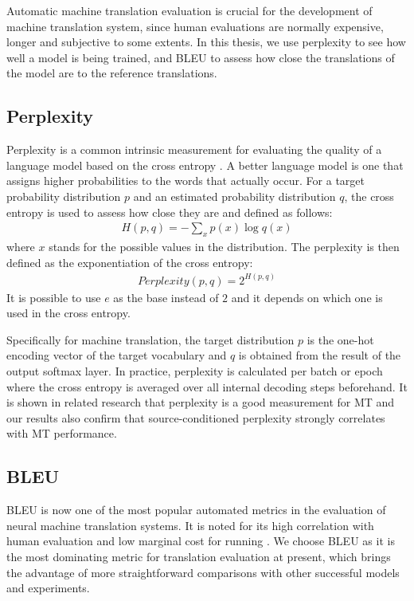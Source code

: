 Automatic machine translation evaluation is crucial for the development of machine translation system, since human evaluations are normally expensive, longer and subjective to some extents. In this thesis, we use perplexity to see how well a model is being trained, and BLEU to assess how close the translations of the model are to the reference translations.

\subsection{Perplexity}

Perplexity is a common intrinsic measurement for evaluating the quality of a language model based on the cross entropy \cite{koehn2009statistical}. A better language model is one that assigns higher probabilities to the words that actually occur. For a target probability distribution $ p $ and an estimated probability distribution $ q $, the cross entropy is used to assess how close they are and defined as follows:
\begin{align*}
H(p,q) = - \sum_{x} p(x) \log q(x)
\end{align*}
where $ x $ stands for the possible values in the distribution. The perplexity is then defined as the exponentiation of the cross entropy:
\begin{align*}
Perplexity(p,q) = 2^{H(p,q)}
\end{align*}
It is possible to use $ e $ as the base instead of $ 2 $ and it depends on which one is used in the cross entropy.

Specifically for machine translation, the target distribution $ p $ is the one-hot encoding vector of the target vocabulary and $ q $ is obtained from the result of the output softmax layer. In practice, perplexity is calculated per batch or epoch where the cross entropy is averaged over all internal decoding steps beforehand. It is shown in related research \cite{luong2015deep,Wu2016} that perplexity is a good measurement for MT and our results also confirm that source-conditioned perplexity strongly correlates with MT performance.

\subsection{BLEU}

BLEU is now one of the most popular automated metrics in the evaluation of neural machine translation systems. It is noted for its high correlation with human evaluation and low marginal cost for running \cite{Papineni2002}. We choose BLEU as it is the most dominating metric for translation evaluation at present, which brings the advantage of more straightforward comparisons with other successful models and experiments.

